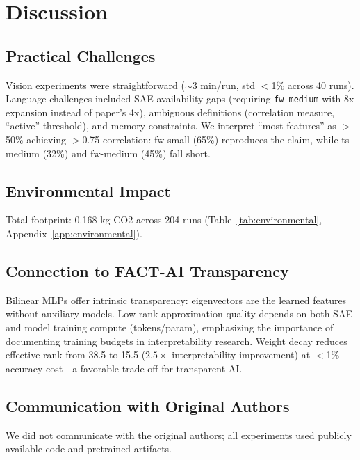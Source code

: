 
\section{Discussion}
\label{sec:discussion}

\subsection{Practical Challenges}

Vision experiments were straightforward ($\sim$3 min/run, std $<$1\% across 40 runs).
Language challenges included SAE availability gaps (requiring \texttt{fw-medium} with 8x expansion instead of paper's 4x), ambiguous definitions (correlation measure, ``active'' threshold), and memory constraints.
We interpret ``most features'' as $>$50\% achieving $>$0.75 correlation: fw-small (65\%) reproduces the claim, while ts-medium (32\%) and fw-medium (45\%) fall short.

\subsection{Environmental Impact}
\label{sec:environmental}

Total footprint: 0.168 kg CO2 across 204 runs (Table~\ref{tab:environmental}, Appendix~\ref{app:environmental}).

\subsection{Connection to FACT-AI Transparency}

Bilinear MLPs offer intrinsic transparency: eigenvectors are the learned features without auxiliary models.
Low-rank approximation quality depends on both SAE and model training compute (tokens/param), emphasizing the importance of documenting training budgets in interpretability research.
Weight decay reduces effective rank from 38.5 to 15.5 ($2.5\times$ interpretability improvement) at $<$1\% accuracy cost---a favorable trade-off for transparent AI.

\subsection{Communication with Original Authors}

We did not communicate with the original authors; all experiments used publicly available code and pretrained artifacts.

